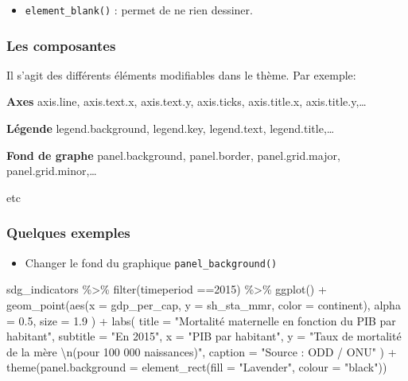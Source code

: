 \documentclass[
]{book}
\newenvironment{Shaded}{\begin{snugshade}}{\end{snugshade}}
\newcommand{\AttributeTok}[1]{\textcolor[rgb]{0.77,0.63,0.00}{#1}}
\newcommand{\DecValTok}[1]{\textcolor[rgb]{0.00,0.00,0.81}{#1}}
\newcommand{\FloatTok}[1]{\textcolor[rgb]{0.00,0.00,0.81}{#1}}
\newcommand{\FunctionTok}[1]{\textcolor[rgb]{0.00,0.00,0.00}{#1}}
\newcommand{\NormalTok}[1]{#1}
\newcommand{\SpecialCharTok}[1]{\textcolor[rgb]{0.00,0.00,0.00}{#1}}
\newcommand{\StringTok}[1]{\textcolor[rgb]{0.31,0.60,0.02}{#1}}
\providecommand{\tightlist}{%
  \setlength{\itemsep}{0pt}\setlength{\parskip}{0pt}}
\begin{document}
\begin{itemize}
\tightlist
\item
  \texttt{element\_blank()} : permet de ne rien dessiner.
\end{itemize}

\hypertarget{les-composantes}{%
\subsubsection{Les composantes}\label{les-composantes}}

Il s'agit des différents éléments modifiables dans le thème.
Par exemple:

\textbf{Axes}
axis.line, axis.text.x, axis.text.y, axis.ticks, axis.title.x, axis.title.y,\ldots{}

\textbf{Légende}
legend.background, legend.key, legend.text, legend.title,\ldots{}

\textbf{Fond de graphe}
panel.background, panel.border, panel.grid.major, panel.grid.minor,\ldots{}

etc

\hypertarget{quelques-exemples}{%
\subsubsection{Quelques exemples}\label{quelques-exemples}}

\begin{itemize}
\tightlist
\item
  Changer le fond du graphique \texttt{panel\_background()}
\end{itemize}

\begin{Shaded}
\begin{Highlighting}[]
\NormalTok{sdg\_indicators }\SpecialCharTok{\%\textgreater{}\%} 
  \FunctionTok{filter}\NormalTok{(timeperiod }\SpecialCharTok{==}\DecValTok{2015}\NormalTok{) }\SpecialCharTok{\%\textgreater{}\%} 
  \FunctionTok{ggplot}\NormalTok{() }\SpecialCharTok{+}
  \FunctionTok{geom\_point}\NormalTok{(}\FunctionTok{aes}\NormalTok{(}\AttributeTok{x =}\NormalTok{ gdp\_per\_cap, }
                 \AttributeTok{y =}\NormalTok{ sh\_sta\_mmr,}
                 \AttributeTok{color =}\NormalTok{ continent),}
    \AttributeTok{alpha =} \FloatTok{0.5}\NormalTok{, }
    \AttributeTok{size =} \FloatTok{1.9}
\NormalTok{  ) }\SpecialCharTok{+}
  \FunctionTok{labs}\NormalTok{(}
    \AttributeTok{title =} \StringTok{"Mortalité maternelle en fonction du PIB par habitant"}\NormalTok{,}
    \AttributeTok{subtitle =} \StringTok{"En 2015"}\NormalTok{,}
    \AttributeTok{x =} \StringTok{"PIB par habitant"}\NormalTok{,}
    \AttributeTok{y =} \StringTok{"Taux de mortalité de la mère }\SpecialCharTok{\textbackslash{}n}\StringTok{(pour 100 000 naissances)"}\NormalTok{,}
    \AttributeTok{caption =} \StringTok{"Source : ODD / ONU"}
\NormalTok{  ) }\SpecialCharTok{+}
  \FunctionTok{theme}\NormalTok{(}\AttributeTok{panel.background =} \FunctionTok{element\_rect}\NormalTok{(}\AttributeTok{fill =} \StringTok{"Lavender"}\NormalTok{, }\AttributeTok{colour =} \StringTok{"black"}\NormalTok{))}
\end{Highlighting}
\end{Shaded}
\end{document}
